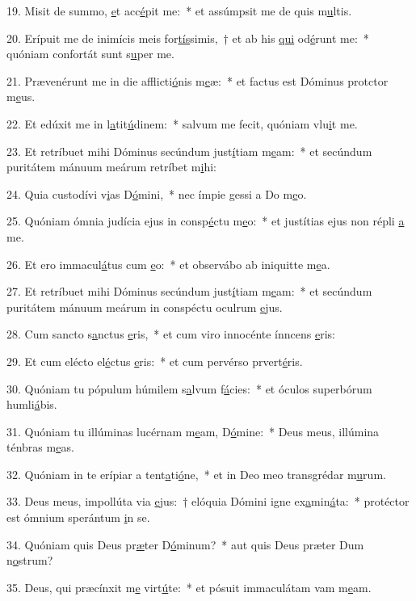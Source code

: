 19. Misit de summo, \uline{e}t acc\uline{é}pit me:~* et assúmpsit me de quis m\uline{u}ltis.\par 
20. Erípuit me de inimícis meis for\uline{tís}simis,~† et ab his \uline{qui} od\uline{é}runt me:~* quóniam confortát sunt s\uline{u}per me.\par 
21. Prævenérunt me in die afflicti\uline{ó}nis m\uline{e}æ:~* et factus est Dóminus protctor m\uline{e}us.\par 
22. Et edúxit me in l\uline{a}tit\uline{ú}dinem:~* salvum me fecit, quóniam vlu\uline{i}t me.\par 
23. Et retríbuet mihi Dóminus secúndum just\uline{í}tiam m\uline{e}am:~* et secúndum puritátem mánuum meárum retríbet m\uline{i}hi:\par 
24. Quia custodívi v\uline{i}as D\uline{ó}mini,~* nec ímpie gessi a Do m\uline{e}o.\par 
25. Quóniam ómnia judícia ejus in consp\uline{é}ctu m\uline{e}o:~* et justítias ejus non répli \uline{a} me.\par 
26. Et ero immacul\uline{á}tus cum \uline{e}o:~* et observábo ab iniquitte m\uline{e}a.\par 
27. Et retríbuet mihi Dóminus secúndum just\uline{í}tiam m\uline{e}am:~* et secúndum puritátem mánuum meárum in conspéctu oculrum \uline{e}jus.\par 
28. Cum sancto s\uline{a}nctus \uline{e}ris,~* et cum viro innocénte ínncens \uline{e}ris:\par 
29. Et cum elécto el\uline{é}ctus \uline{e}ris:~* et cum pervérso prvert\uline{é}ris.\par 
30. Quóniam tu pópulum húmilem s\uline{a}lvum f\uline{á}cies:~* et óculos superbórum humli\uline{á}bis.\par 
31. Quóniam tu illúminas lucérnam m\uline{e}am, D\uline{ó}mine:~* Deus meus, illúmina ténbras m\uline{e}as.\par 
32. Quóniam in te erípiar a tent\uline{a}ti\uline{ó}ne,~* et in Deo meo transgrédar m\uline{u}rum.\par 
33. Deus meus, impollúta via \uline{e}jus:~† elóquia Dómini igne ex\uline{a}min\uline{á}ta:~* protéctor est ómnium sperántum \uline{i}n se.\par 
34. Quóniam quis Deus pr\uline{æ}ter D\uline{ó}minum?~* aut quis Deus præter Dum n\uline{o}strum?\par 
35. Deus, qui præcínxit m\uline{e} virt\uline{ú}te:~* et pósuit immaculátam vam m\uline{e}am.\par 
